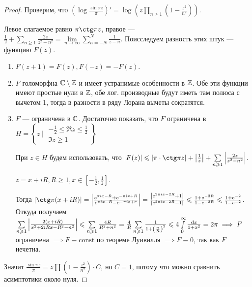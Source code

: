 \begin{proof}
    Проверим, что $\left( \log \frac{\sin \pi z}{\pi} \right) ' = \log \left( z \prod\limits_{n \ge 1} \left( 1 - \frac{z^2}{n^2} \right)  \right)$.

    Левое слагаемое равно $\pi \ctg \pi z$, правое ---  $\frac{1}{2} + \sum\limits_{n \ge  1} \frac{2z}{z^2 - n^2} = \lim\limits_{n \to \infty} \sum\limits_{n = -N}^N \frac{1}{z - n}$. Поисследуем разность этих штук --- функцию $F(z)$.
     \begin{enumerate}
        \item $F(z + 1) = F(z), F(-z) = -F\left(z  \right) $.
        \item $F$ голоморфна  $\mathbb{C} \setminus \mathbb{Z}$ и имеет устранимые особенности в $\mathbb{Z}$. Обе эти функции имеют простые нули в $\mathbb{Z}$, обе лог. производные будут иметь там полюса с вычетом 1, тогда в разности в ряду Лорана вычеты сократятся.
        \item $F$ --- ограничена в  $\mathbb{C}$. Достаточно показать, что  $F$ ограничена в  $H = \left\{ z \mid \substack{-\frac{1}{2} \le \Re z \le  \frac{1}{2}\\ \Im z \ge 1} \right\} $

        При $z \in H$ будем использовать, что  $\left| F(z) \right| \le  \left| \pi \cdot \ctg \pi z \right| + \left| \frac{1}{z} \right| + \sum\limits_{n \ge  1} \left| \frac{2z}{z^2-n^2} \right|$. 

        $z = x + iR, R \ge 1, x \in \left[ -\frac{1}{2}, \frac{1}{2} \right]$.

        Тогда $\left| \ctg \pi (x + iR) \right| = \left| \frac{e^{\pi i x - R} + e^{-\pi i x + R}}{e^{\pi i x - R} - e^{-\pi i x + r}} \right|  = \frac{\left| e^{2 \pi i x - 2R} + 1 \right| }{\left| e^{2 \pi i x -2R} - 1 \right| } \le \frac{1 + e^{-2R}}{1 - e^{-2R}} \le  \frac{1+e^{-2}}{1 - e^{-2}}$. Откуда получаем $\sum\limits_{n \geqslant 1} \left| \frac{2(x+iR)}{x^2 + 2iRx - R^2 - n^2} \right| \leqslant \sum\limits_{n \geqslant 1} \frac{4R}{R^2 + n^2} = \frac{4}{R} \sum\limits_{n \geqslant  1} \frac{1}{1 + \left( \frac{n}{R} \right) ^2} \leqslant  4 \int\limits_{0}^{\infty}  \frac{\mathrm{d}x}{1+x^2} = 2\pi \implies F$ ограничена $\implies F \equiv \mathrm{const}$ по теореме Луивилля  $\implies F \equiv 0$, так как  $F$ нечетна.
    \end{enumerate}
    Значит $\frac{\sin \pi z}{\pi} = z \prod \left( 1 - \frac{z^2}{n^2} \right) \cdot C$, но $C = 1$, потому что можно сравнить асимптотики около нуля.
\end{proof}
